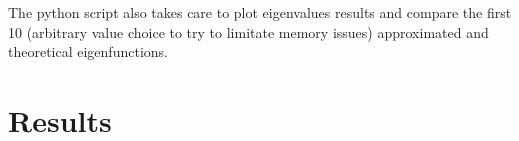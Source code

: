 \documentclass[12pt, a4paper, notitlepage]{report}
\begin{document}
The python script also takes care to plot eigenvalues results and compare the first 10 (arbitrary value choice to try to limitate memory issues) approximated and theoretical eigenfunctions.



\section*{Results}

\begin{figure}[h!]
	\centering
	\label{L5k10}
	\label{L5k100}

\end{figure}
\end{document}
